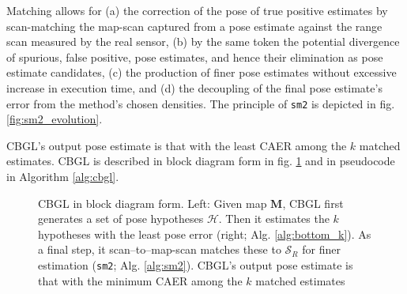 Matching allows for (a) the correction of the pose of true positive estimates
by scan-matching the map-scan captured from a pose estimate against the range
scan measured by the real sensor, (b) by the same token the potential
divergence of spurious, false positive, pose estimates, and hence their
elimination as pose estimate candidates, (c) the production of finer pose
estimates without excessive increase in execution time, and (d) the decoupling
of the final pose estimate's error from the method's chosen densities. The
principle of \texttt{sm2} is depicted in fig. \ref{fig:sm2_evolution}.

CBGL's output pose estimate is that with the least CAER among the $k$ matched
estimates. CBGL is described in block diagram form in fig.
\ref{fig:block_system} and in pseudocode in Algorithm \ref{alg:cbgl}.


\begin{figure}\vspace{-0.4cm}
  \subfloat{\label{fig:cbgl}     }
  \subfloat{\label{fig:bottom_k} }
  \caption{\small CBGL in block diagram form. Left: Given map $\bm{M}$, CBGL
           first generates a set of pose hypotheses $\mathcal{H}$. Then it
           estimates the $k$ hypotheses with the least pose error (right; Alg.
           \ref{alg:bottom_k}).
           As a final step, it scan--to--map-scan
           matches these to $\mathcal{S}_R$ for finer estimation
           (\texttt{sm2}; Alg.
           \ref{alg:sm2}).
           CBGL's output pose estimate is that with
           the minimum CAER among the $k$ matched estimates
           }
\vspace{-0.5cm}
  \label{fig:block_system}
\end{figure}




